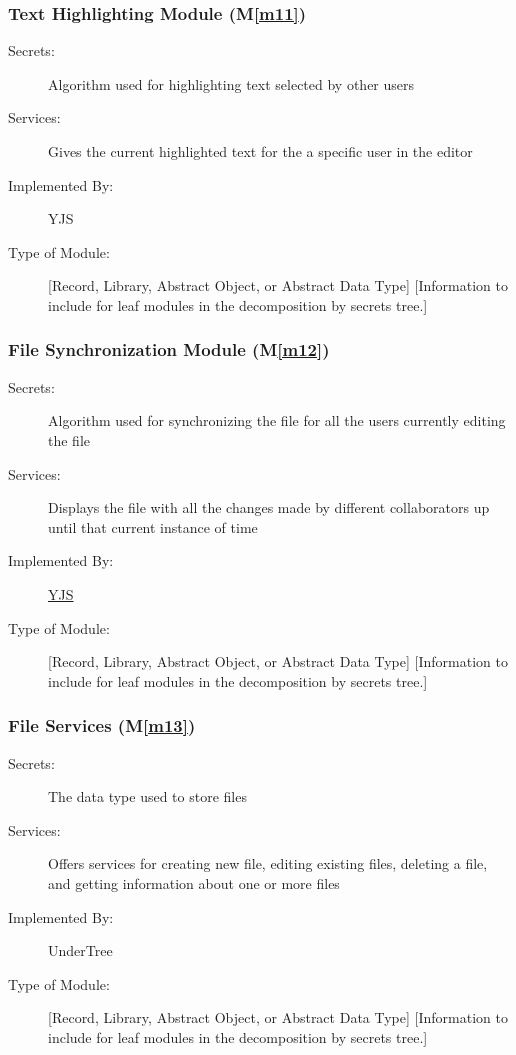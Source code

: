\documentclass[12pt, titlepage]{article}
\newcommand{\mref}[1]{M\ref{#1}}
\begin{document}
	\subsubsection{Text Highlighting Module (\mref{m11})}
	
	\begin{description}
		\item[Secrets:] Algorithm used for highlighting text selected by other users
		\item[Services:] Gives the current highlighted text for the a specific user in the editor
		\item[Implemented By:] YJS
		\item[Type of Module:] [Record, Library, Abstract Object, or Abstract Data Type]
		[Information to include for leaf modules in the decomposition by secrets tree.]
	\end{description}
	
	\subsubsection{File Synchronization Module (\mref{m12})}
	
	\begin{description}
		\item[Secrets:] Algorithm used for synchronizing the file for all the users currently editing the file
		\item[Services:] Displays the file with all the changes made by different collaborators up until that current instance of time
		\item[Implemented By:] \href{https://docs.yjs.dev/}{YJS}
		\item[Type of Module:] [Record, Library, Abstract Object, or Abstract Data Type]
		[Information to include for leaf modules in the decomposition by secrets tree.]
	\end{description}
	
	\subsubsection{File Services (\mref{m13})}
	
	\begin{description}
		\item[Secrets:] The data type used to store files
		\item[Services:] Offers services for creating new file, editing existing files, deleting a file, and getting information about one or more files
		\item[Implemented By:] UnderTree
		\item[Type of Module:] [Record, Library, Abstract Object, or Abstract Data Type]
		[Information to include for leaf modules in the decomposition by secrets tree.]
	\end{description}
	
\end{document}
